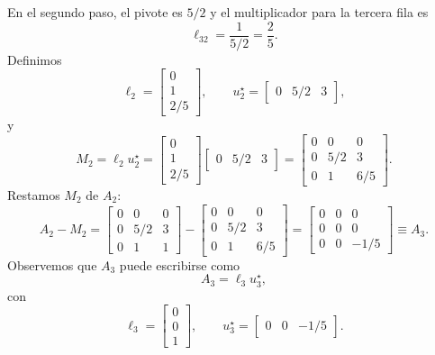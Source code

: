 En el segundo paso, el pivote es $5/2$ y el multiplicador para la tercera fila es
\[
\ell_{32} = \frac{1}{5/2} = \frac{2}{5}.
\]
Definimos
\[
\ell_2 = \begin{bmatrix} 0 \\ 1 \\ 2/5 \end{bmatrix}, \qquad
u_2^\star = \begin{bmatrix} 0 & 5/2 & 3 \end{bmatrix},
\]
y
\[
M_2 = \ell_2 u_2^\star =
\begin{bmatrix}
0 \\ 1 \\ 2/5
\end{bmatrix}
\begin{bmatrix}
0 & 5/2 & 3
\end{bmatrix}
=
\begin{bmatrix}
0 & 0 & 0 \\
0 & 5/2 & 3 \\
0 & 1 & 6/5
\end{bmatrix}.
\]
Restamos $M_2$ de $A_2$:
\[
A_2 - M_2 =
\begin{bmatrix}
0 & 0 & 0 \\
0 & 5/2 & 3 \\
0 & 1 & 1
\end{bmatrix}
-
\begin{bmatrix}
0 & 0 & 0 \\
0 & 5/2 & 3 \\
0 & 1 & 6/5
\end{bmatrix}
=
\begin{bmatrix}
0 & 0 & 0 \\
0 & 0 & 0 \\
0 & 0 & -1/5
\end{bmatrix}
\equiv A_3.
\]
Observemos que $A_3$ puede escribirse como
\[
A_3 = \ell_3 u_3^\star,
\]
con
\[
\ell_3 = \begin{bmatrix} 0 \\ 0 \\ 1 \end{bmatrix}, \qquad
u_3^\star = \begin{bmatrix} 0 & 0 & -1/5 \end{bmatrix}.
\]

